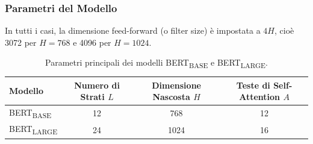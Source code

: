 \documentclass[../../Thesis.tex]{subfiles}
\begin{document}
\subsubsection{Parametri del Modello}
In tutti i casi, la dimensione feed-forward (o filter size) è impostata a $4H$, cioè 3072 per $H = 768$ e 4096 per $H = 1024$.

\begin{table}[h]
    \centering
    \begin{tabular}{lccc}
        \toprule
        Modello & Numero di Strati $L$ & Dimensione Nascosta $H$ & Teste di Self-Attention $A$ \\
        \midrule
        BERT\textsubscript{BASE} & 12 & 768 & 12 \\
        BERT\textsubscript{LARGE} & 24 & 1024 & 16 \\
        \bottomrule
    \end{tabular}
    \caption{Parametri principali dei modelli BERT\textsubscript{BASE} e BERT\textsubscript{LARGE}.}
    \label{tab:bert_params}
\end{table}
\end{document}
